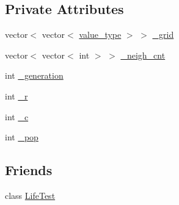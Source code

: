 \subsection*{Private Attributes}
\begin{DoxyCompactItemize}
\item 
vector$<$ vector$<$ \hyperlink{classLife_aa51e5c8b3a0acdfa99fc9ea8c2b550f8}{value\-\_\-type} $>$ $>$ \hyperlink{classLife_ab5d60edbdbea13736cfca6c82ec8195c}{\-\_\-grid}
\item 
vector$<$ vector$<$ int $>$ $>$ \hyperlink{classLife_add8ba14e19e6a8a607ce21c760f694b0}{\-\_\-neigh\-\_\-cnt}
\item 
int \hyperlink{classLife_a0f0c9edeadd6b61c2265baebe7df18af}{\-\_\-generation}
\item 
int \hyperlink{classLife_a26447fd1550c387c632ae95866e41838}{\-\_\-r}
\item 
int \hyperlink{classLife_ae3c3c50dc1a50876bfd29a3a7718f71d}{\-\_\-c}
\item 
int \hyperlink{classLife_afb729fe0cf5f5cb909b8c36de4ea689f}{\-\_\-pop}
\end{DoxyCompactItemize}
\subsection*{Friends}
\begin{DoxyCompactItemize}
\item 
class \hyperlink{classLife_ac09a12090bbd959da33d05c9c8bfa744}{Life\-Test}
\end{DoxyCompactItemize}


